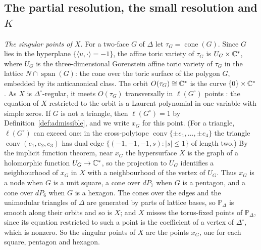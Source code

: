 \subsection{The partial resolution, the small resolution and \texorpdfstring{$K$}{K}}\label{ssec:partialres}
\emph{The singular points of $X$.} For a two-face $G$ of $\Delta$ let $\tau_G=\operatorname{cone}(G)$. Since $G$ lies in
the hyperplane $\{\langle u,\cdot\rangle=-1\}$, the affine toric variety of $\tau_G$ is $U_G\times\mathbb C^*$, where $U_G$ is the
three-dimensional Gorenstein affine toric variety of $\tau_G$ in the lattice $N\cap\operatorname{span}(G)$: the cone over
the toric surface of the polygon $G$, embedded by its anticanonical class. The orbit $O(\tau_G)\cong\mathbb C^*$ is the curve
$\{0\}\times\mathbb C^*$. As $X$ is $\Delta^\circ$-regular, it meets $O(\tau_G)$ transversally in $\ell(G^\circ)$ points
\cite[\S3]{Batyrev}: the equation of $X$ restricted to the orbit is a Laurent polynomial in one variable with simple
zeros. If $G$ is not a triangle, then $\ell(G^\circ)=1$ by Definition~\ref{def:admissible}, and we write $x_G$ for this point. (For a triangle,
$\ell(G^\circ)$ can exceed one: in the cross-polytope $\operatorname{conv}\{\pm e_1,\dots,\pm e_4\}$ the triangle
$\operatorname{conv}(e_1,e_2,e_3)$ has dual edge $\{(-1,-1,-1,s):|s|\le1\}$ of length two.) By the implicit function
theorem, near $x_G$ the hypersurface $X$ is the graph of a holomorphic function
$U_G\to\mathbb C^*$, so the projection to $U_G$ identifies a neighbourhood of $x_G$ in $X$ with a neighbourhood of the vertex of
$U_G$. Thus $x_G$ is a node when $G$ is a unit square, a cone over $dP_7$ when $G$ is a pentagon, and a cone over $dP_6$
when $G$ is a hexagon. The cones over the edges and the unimodular triangles of $\Delta$ are generated by parts of lattice
bases, so $\mathbb P_\Delta$ is smooth along their orbits and so is $X$; and $X$ misses the torus-fixed points of
$\mathbb P_\Delta$, since its equation restricted to such a point is the coefficient of a vertex of $\Delta^\circ$, which
is nonzero. So the singular points of $X$ are the points $x_G$, one for each square, pentagon and hexagon.

